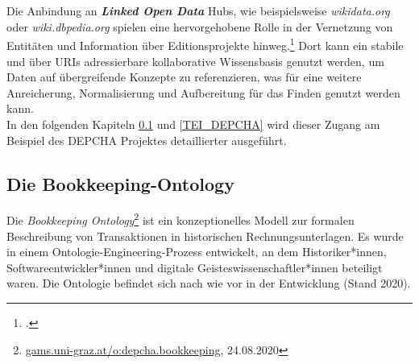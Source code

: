 \documentclass[12pt,a4paper]{article}
\begin{document}
{\\
\\
Die Anbindung an \textbf{\textit{Linked Open Data}} Hubs, wie beispielsweise \textit{wikidata.org} oder \textit{wiki.dbpedia.org} spielen eine hervorgehobene Rolle in der Vernetzung von Entitäten und Information über Editionsprojekte hinweg.\footcite{wettlaufer2018semanticwebEdition} Dort kann ein stabile und über URIs adressierbare kollaborative Wissensbasis genutzt werden, um Daten auf übergreifende Konzepte zu referenzieren, was für eine weitere Anreicherung, Normalisierung und Aufbereitung für das Finden genutzt werden kann. 
\\
In den folgenden Kapiteln \ref{BK} und \ref{TEI_DEPCHA} wird dieser Zugang am Beispiel des DEPCHA Projektes detaillierter ausgeführt.
}

\newpage
\subsection{Die Bookkeeping-Ontology}
\label{BK}

Die \textit{Bookkeeping Ontology}\footnote{\url{gams.uni-graz.at/o:depcha.bookkeeping}, 24.08.2020} ist ein konzeptionelles Modell zur formalen Beschreibung von Transaktionen in historischen Rechnungsunterlagen. Es wurde in einem Ontologie-Engineering-Prozess entwickelt, an dem Historiker*innen, Softwareentwickler*innen und digitale Geisteswissenschaftler*innen beteiligt waren. Die Ontologie befindet sich nach wie vor in der Entwicklung (Stand 2020).
\end{document}
